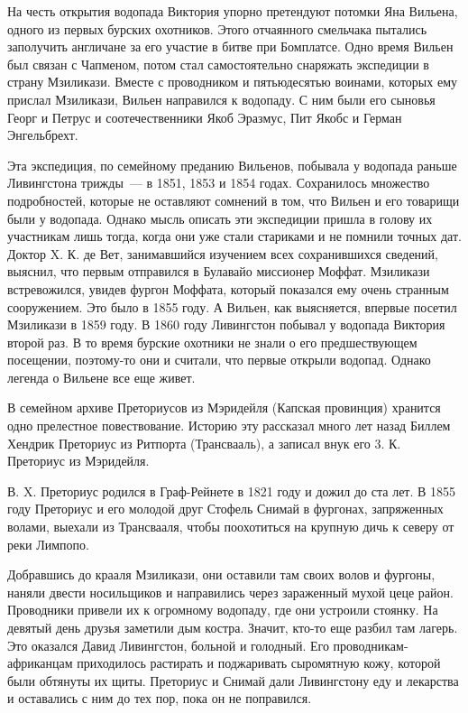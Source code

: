 \documentclass[12pt,a4paper,twoside,openany,svgnames]{memoir}
\begin{document}
На честь открытия водопада Виктория упорно претендуют потомки Яна Вильена, одного из первых бурских охотников. Этого отчаянного смельчака пытались заполучить англичане за его участие в битве при Бомплатсе. Одно время Вильен был связан с Чапменом, потом стал самостоятельно снаряжать экспедиции в страну Мзиликази. Вместе с проводником и пятьюдесятью воинами, которых ему прислал Мзиликази, Вильен направился к водопаду. С ним были его сыновья Георг и Петрус и соотечественники Якоб Эразмус, Пит Якобс и Герман Энгельбрехт.

Эта экспедиция, по семейному преданию Вильенов, побывала у водопада раньше Ливингстона трижды~--- в 1851, 1853 и 1854 годах. Сохранилось множество подробностей, которые не оставляют сомнений в том, что Вильен и его товарищи были у водопада. Однако мысль описать эти экспедиции пришла в голову их участникам лишь тогда, когда они уже стали стариками и не помнили точных дат. Доктор X. К. де Вет, занимавшийся изучением всех сохранившихся сведений, выяснил, что первым отправился в Булавайо миссионер Моффат. Мзиликази встревожился, увидев фургон Моффата, который показался ему очень странным сооружением. Это было в 1855 году. А Вильен, как выясняется, впервые посетил Мзиликази в 1859 году. В 1860 году Ливингстон побывал у водопада Виктория второй раз. В то время бурские охотники не знали о его предшествующем посещении, поэтому-то они и считали, что первые открыли водопад. Однако легенда о Вильене все еще живет.

В семейном архиве Преториусов из Мэридейля (Капская провинция) хранится одно прелестное повествование. Историю эту рассказал много лет назад Биллем Хендрик Преториус из Ритпорта (Трансвааль), а записал внук его 3. К. Преториус из Мэридейля.

В. X. Преториус родился в Граф-Рейнете в 1821 году и дожил до ста лет. В 1855 году Преториус и его молодой друг Стофель Снимай в фургонах, запряженных волами, выехали из Трансвааля, чтобы поохотиться на крупную дичь к северу от реки Лимпопо.

Добравшись до крааля Мзиликази, они оставили там своих волов и фургоны, наняли двести носильщиков и направились через зараженный мухой цеце район. Проводники привели их к огромному водопаду, где они устроили стоянку. На девятый день друзья заметили дым костра. Значит, кто-то еще разбил там лагерь. Это оказался Давид Ливингстон, больной и голодный. Его проводникам-африканцам приходилось растирать и поджаривать сыромятную кожу, которой были обтянуты их щиты. Преториус и Снимай дали Ливингстону еду и лекарства и оставались с ним до тех пор, пока он не поправился.
\end{document}
